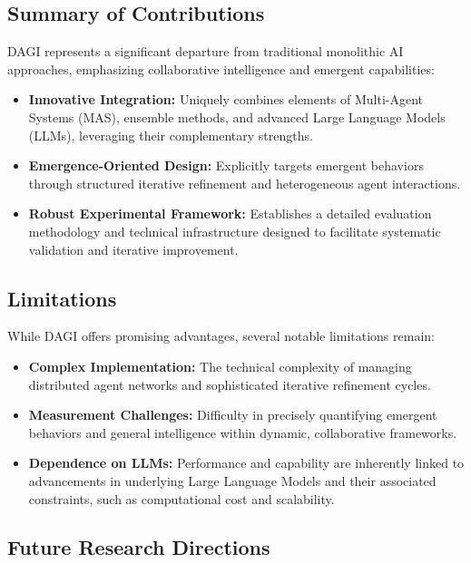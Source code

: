 \documentclass[12pt]{amsart}
\begin{document}
\subsection{Summary of Contributions}

DAGI represents a significant departure from traditional monolithic AI approaches, emphasizing collaborative intelligence and emergent capabilities:

\begin{itemize}
    \item \textbf{Innovative Integration:} Uniquely combines elements of Multi-Agent Systems (MAS), ensemble methods, and advanced Large Language Models (LLMs), leveraging their complementary strengths.
    \item \textbf{Emergence-Oriented Design:} Explicitly targets emergent behaviors through structured iterative refinement and heterogeneous agent interactions.
    \item \textbf{Robust Experimental Framework:} Establishes a detailed evaluation methodology and technical infrastructure designed to facilitate systematic validation and iterative improvement.
\end{itemize}

\subsection{Limitations}

While DAGI offers promising advantages, several notable limitations remain:

\begin{itemize}
    \item \textbf{Complex Implementation:} The technical complexity of managing distributed agent networks and sophisticated iterative refinement cycles.
    \item \textbf{Measurement Challenges:} Difficulty in precisely quantifying emergent behaviors and general intelligence within dynamic, collaborative frameworks.
    \item \textbf{Dependence on LLMs:} Performance and capability are inherently linked to advancements in underlying Large Language Models and their associated constraints, such as computational cost and scalability.
\end{itemize}

\subsection{Future Research Directions}
\end{document}
